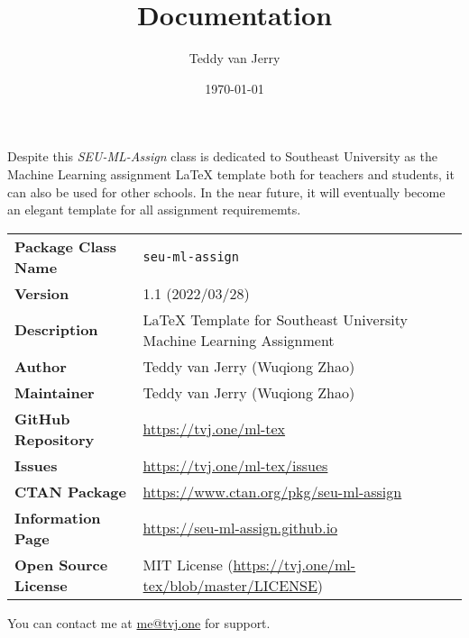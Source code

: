 \documentclass[twoside]{seu-ml-assign}
\title{Documentation}
\author{Teddy van Jerry}
\date{\today}
\newcommand{\grayrow}{\rowcolor[rgb]{ .906,  .902,  .902}}
\begin{document}
  \maketitle


    Despite this \textit{SEU-ML-Assign} class is dedicated to Southeast University as the Machine Learning assignment \LaTeX{} template both for teachers and students, it can also be used for other schools.
    In the near future, it will eventually become an elegant template for all assignment requirememts.

    \begin{table}[htbp]
      \bgroup
        \def\arraystretch{1.2}
        \setlength{\tabcolsep}{1.5em}
        \begin{tabular}{ll}
        \toprule
          \grayrow \textbf{Package Class Name} & \texttt{seu-ml-assign} \\
          \textbf{Version} & 1.1 (2022/03/28) \\
          \grayrow \textbf{Description} & \LaTeX{} Template for Southeast University Machine Learning Assignment \\
          \textbf{Author} & Teddy van Jerry (Wuqiong Zhao) \\
          \grayrow \textbf{Maintainer} & Teddy van Jerry (Wuqiong Zhao) \\
          \textbf{GitHub Repository} & \url{https://tvj.one/ml-tex} \\
          \grayrow \textbf{Issues} & \url{https://tvj.one/ml-tex/issues} \\
          \textbf{CTAN Package} & \url{https://www.ctan.org/pkg/seu-ml-assign} \\
          \grayrow \textbf{Information Page} & \url{https://seu-ml-assign.github.io} \\
          \textbf{Open Source License} & MIT License (\url{https://tvj.one/ml-tex/blob/master/LICENSE}) \\
        \bottomrule
        \end{tabular}%
      \egroup
    \end{table}

    You can contact me at \href{mailto:me@tvj.one}{me@tvj.one} for support.

\end{document}
